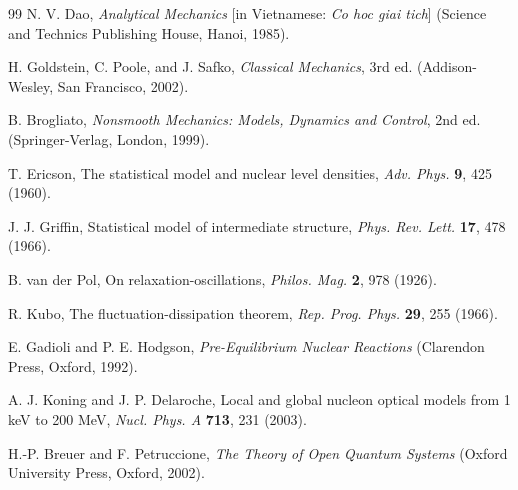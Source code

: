 \documentclass[aps,prc,twocolumn,superscriptaddress,amsmath,amssymb,nofootinbib]{revtex4-2}
\begin{document}
\begin{thebibliography}{99}
N. V. Dao, \emph{Analytical Mechanics} [in Vietnamese: \emph{Co hoc giai tich}] (Science and Technics Publishing House, Hanoi, 1985).

H. Goldstein, C. Poole, and J. Safko, \emph{Classical Mechanics}, 3rd ed. (Addison-Wesley, San Francisco, 2002).

B. Brogliato, \emph{Nonsmooth Mechanics: Models, Dynamics and Control}, 2nd ed. (Springer-Verlag, London, 1999).

T. Ericson, The statistical model and nuclear level densities, \emph{Adv. Phys.} \textbf{9}, 425 (1960).

J. J. Griffin, Statistical model of intermediate structure, \emph{Phys. Rev. Lett.} \textbf{17}, 478 (1966).

B. van der Pol, On relaxation-oscillations, \emph{Philos. Mag.} \textbf{2}, 978 (1926).

R. Kubo, The fluctuation-dissipation theorem, \emph{Rep. Prog. Phys.} \textbf{29}, 255 (1966).

E. Gadioli and P. E. Hodgson, \emph{Pre-Equilibrium Nuclear Reactions} (Clarendon Press, Oxford, 1992).

A. J. Koning and J. P. Delaroche, Local and global nucleon optical models from 1 keV to 200 MeV, \emph{Nucl. Phys. A} \textbf{713}, 231 (2003).

H.-P. Breuer and F. Petruccione, \emph{The Theory of Open Quantum Systems} (Oxford University Press, Oxford, 2002).
\end{thebibliography}
\end{document}

